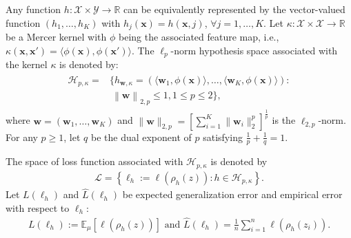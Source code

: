 \documentclass{article}
\begin{document}
Any function $h:\mathcal{X}\times\mathcal{Y}\rightarrow \mathbb{R}$ can be equivalently represented by the vector-valued function
$(h_1,\ldots,h_K)$ with $h_j(\mathbf x)=h(\mathbf x,j)$, $\forall j=1,\ldots,K$.
Let $\kappa:\mathcal{X}\times\mathcal{X}\rightarrow\mathbb{R}$ be a Mercer kernel with $\phi$ being the associated feature map,
i.e., $\kappa(\mathbf x,\mathbf x')=\langle \phi(\mathbf x),\phi(\mathbf x')\rangle$.
The $\ell_p$-norm hypothesis space associated with the kernel $\kappa$ is denoted by:
 \begin{align}
 \label{hypothspapce}
   \begin{aligned}
   \mathcal{H}_{p,\kappa}=&\Big\{h_{\mathbf{w}, \kappa}=\left(\langle \mathbf w_1,\phi(\mathbf x)\rangle,\ldots, \langle\mathbf w_K,\phi(\mathbf x)\rangle\right):\\
   &~\left\|\mathbf  w \right\|_{2,p}\leq 1, 1\leq p\leq 2
  \Big\},
   \end{aligned}
 \end{align}
 where $\mathbf w=(\mathbf w_1,\ldots,\mathbf w_K)$ and $\|\mathbf w\|_{2,p}=\left[\sum_{i=1}^K\|\mathbf w_i\|_2^p\right]^{\frac{1}{p}}$
 is the $\ell_{2,p}$-norm.
 For any $p\geq 1$, let $q$ be the dual exponent of $p$ satisfying $\frac{1}{p}+\frac{1}{q}=1$.

The space of loss function associated with $\mathcal{H}_{p,\kappa}$  is denoted by
\begin{align}
\label{eq-sapce-loss-functions}
  \mathcal{L}=\left\{\ell_h:=\ell(\rho_h(z)):h\in\mathcal{H}_{p,\kappa}\right\}.
\end{align}
Let $L(\ell_h)$ and  $\hat{L}(\ell_h)$ be expected generalization error and
 empirical error  with respect to $\ell_h$:
\begin{align*}
  L(\ell_h):=\mathbb{E}_\mu[\ell(\rho_h(z))] \text{ and } \hat{L}(\ell_h)=\frac{1}{n}\sum_{i=1}^n\ell(\rho_h(z_i)).
\end{align*}




\end{document}
